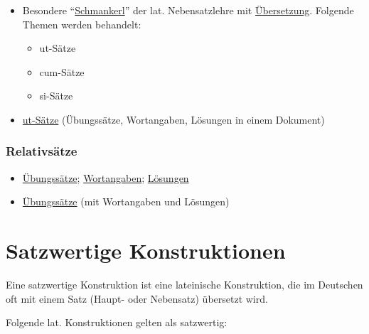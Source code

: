 \documentclass{scrartcl}
\begin{document}
\begin{itemize}
\item Besondere "`\href{https://www.dropbox.com/s/qundz0kc7wi3sp0/grammatik.pdf?dl=0}{Schmankerl}"' der lat. Nebensatzlehre mit
\href{https://www.dropbox.com/s/rv0zs8gtuk155ho/Grammatikrepetition\_\%25C3\%259Cbersetzung.pdf?dl=0}{Übersetzung}. Folgende Themen werden behandelt:
\begin{itemize}
\item ut-Sätze
\item cum-Sätze
\item si-Sätze
\end{itemize}
\item \href{https://www.dropbox.com/s/smmjy9k0a33qfwm/\%25C2\%25A751ut.pdf?dl=0}{ut-Sätze} (Übungssätze, Wortangaben, Lösungen in einem Dokument)
\end{itemize}

\subsubsection{Relativsätze}
\label{sec:org51fb321}

\begin{itemize}
\item \href{https://www.dropbox.com/s/60ggp3yeav4ofe8/Relativs\%25C3\%25A4tze.pdf?dl=0}{Übungssätze}; \href{https://www.dropbox.com/s/ipz22adwi00i8o8/\%25C2\%25A747Relativs\%25C3\%25A4tze.pdf?dl=0}{Wortangaben}; \href{https://www.dropbox.com/s/fttk7f0dwqlrag9/Relativs\%25C3\%25A4tze\_L\%25C3\%25B6sung.pdf?dl=0}{Lösungen}
\item \href{https://www.dropbox.com/s/xxtjdft670v04y2/Relativsatz.pdf?dl=0}{Übungssätze} (mit Wortangaben und Lösungen)
\end{itemize}

\section{Satzwertige Konstruktionen}
\label{sec:org498e56b}
Eine satzwertige Konstruktion ist eine lateinische Konstruktion, die
im Deutschen oft mit einem Satz (Haupt- oder Nebensatz) übersetzt
wird.

Folgende lat. Konstruktionen gelten als satzwertig:
\end{document}
